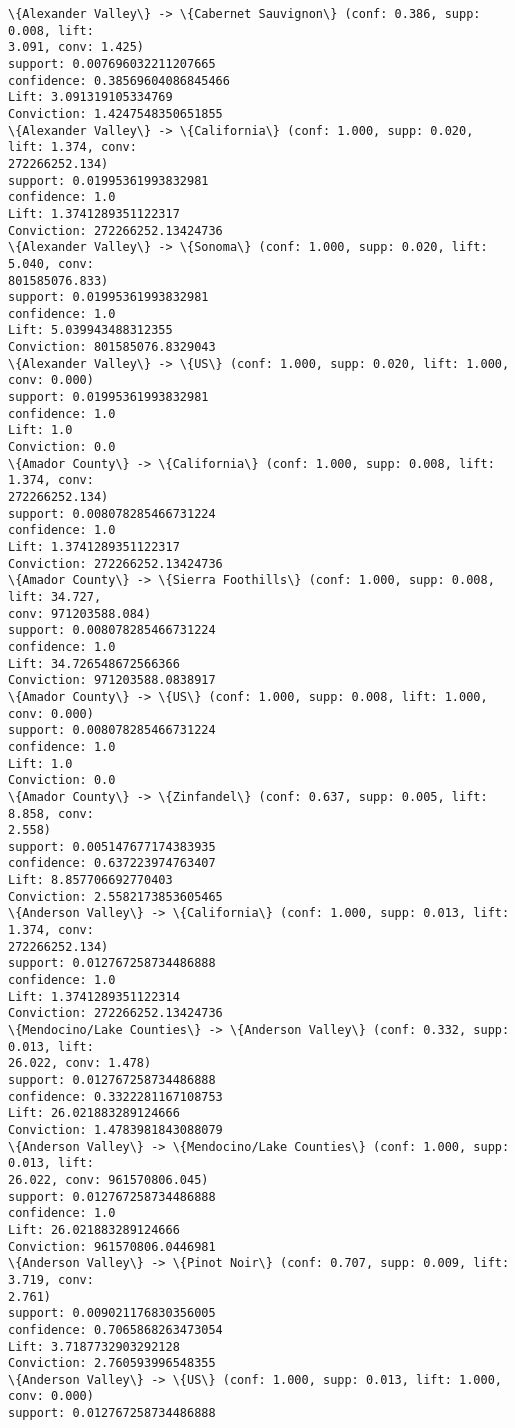 \documentclass[11pt]{article}
\begin{document}
    \begin{Verbatim}[commandchars=\\\{\}]
\{Alexander Valley\} -> \{Cabernet Sauvignon\} (conf: 0.386, supp: 0.008, lift:
3.091, conv: 1.425)
support: 0.007696032211207665
confidence: 0.38569604086845466
Lift: 3.091319105334769
Conviction: 1.4247548350651855
\{Alexander Valley\} -> \{California\} (conf: 1.000, supp: 0.020, lift: 1.374, conv:
272266252.134)
support: 0.01995361993832981
confidence: 1.0
Lift: 1.3741289351122317
Conviction: 272266252.13424736
\{Alexander Valley\} -> \{Sonoma\} (conf: 1.000, supp: 0.020, lift: 5.040, conv:
801585076.833)
support: 0.01995361993832981
confidence: 1.0
Lift: 5.039943488312355
Conviction: 801585076.8329043
\{Alexander Valley\} -> \{US\} (conf: 1.000, supp: 0.020, lift: 1.000, conv: 0.000)
support: 0.01995361993832981
confidence: 1.0
Lift: 1.0
Conviction: 0.0
\{Amador County\} -> \{California\} (conf: 1.000, supp: 0.008, lift: 1.374, conv:
272266252.134)
support: 0.008078285466731224
confidence: 1.0
Lift: 1.3741289351122317
Conviction: 272266252.13424736
\{Amador County\} -> \{Sierra Foothills\} (conf: 1.000, supp: 0.008, lift: 34.727,
conv: 971203588.084)
support: 0.008078285466731224
confidence: 1.0
Lift: 34.726548672566366
Conviction: 971203588.0838917
\{Amador County\} -> \{US\} (conf: 1.000, supp: 0.008, lift: 1.000, conv: 0.000)
support: 0.008078285466731224
confidence: 1.0
Lift: 1.0
Conviction: 0.0
\{Amador County\} -> \{Zinfandel\} (conf: 0.637, supp: 0.005, lift: 8.858, conv:
2.558)
support: 0.005147677174383935
confidence: 0.637223974763407
Lift: 8.857706692770403
Conviction: 2.5582173853605465
\{Anderson Valley\} -> \{California\} (conf: 1.000, supp: 0.013, lift: 1.374, conv:
272266252.134)
support: 0.012767258734486888
confidence: 1.0
Lift: 1.3741289351122314
Conviction: 272266252.13424736
\{Mendocino/Lake Counties\} -> \{Anderson Valley\} (conf: 0.332, supp: 0.013, lift:
26.022, conv: 1.478)
support: 0.012767258734486888
confidence: 0.3322281167108753
Lift: 26.021883289124666
Conviction: 1.4783981843088079
\{Anderson Valley\} -> \{Mendocino/Lake Counties\} (conf: 1.000, supp: 0.013, lift:
26.022, conv: 961570806.045)
support: 0.012767258734486888
confidence: 1.0
Lift: 26.021883289124666
Conviction: 961570806.0446981
\{Anderson Valley\} -> \{Pinot Noir\} (conf: 0.707, supp: 0.009, lift: 3.719, conv:
2.761)
support: 0.009021176830356005
confidence: 0.7065868263473054
Lift: 3.7187732903292128
Conviction: 2.760593996548355
\{Anderson Valley\} -> \{US\} (conf: 1.000, supp: 0.013, lift: 1.000, conv: 0.000)
support: 0.012767258734486888

\end{Verbatim}
\end{document}
